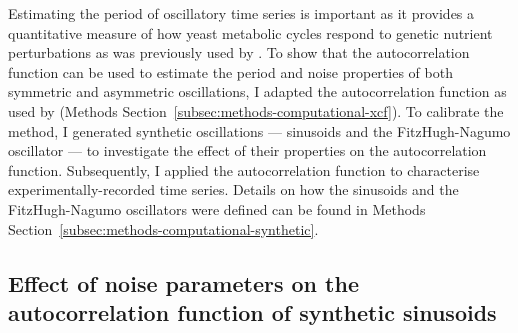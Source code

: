 Estimating the period of oscillatory time series is important as it provides a quantitative measure of how yeast metabolic cycles respond to genetic nutrient perturbations as was previously used by \parencite{papagiannakisAutonomousMetabolicOscillations2017}.
To show that the autocorrelation function can be used to estimate the period and noise properties of both symmetric and asymmetric oscillations, I adapted the autocorrelation function as used by \textcite{pietschDeterminingGrowthRates2023} (Methods Section~\ref{subsec:methods-computational-xcf}).
To calibrate the method, I generated synthetic oscillations --- sinusoids and the FitzHugh-Nagumo oscillator \parencite{fitzhughImpulsesPhysiologicalStates1961} --- to investigate the effect of their properties on the autocorrelation function.
Subsequently, I applied the autocorrelation function to characterise experimentally-recorded time series.
Details on how the sinusoids and the FitzHugh-Nagumo oscillators were defined can be found in Methods Section~\ref{subsec:methods-computational-synthetic}.

\subsection{Effect of noise parameters on the autocorrelation function of synthetic sinusoids}
\label{subsec:analysis-characterisation-acf-sinusoid}

